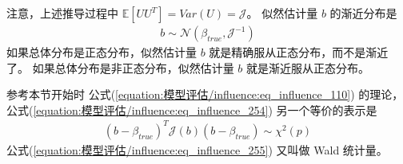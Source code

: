 \documentclass[letterpaper,10pt,english]{sphinxmanual}
\begin{document}
注意，上述推导过程中 \(\mathbb{E} \left[ U U^T  \right ]=Var(U)=\mathcal{J}\)。
似然估计量 \(b\) 的渐近分布是
\begin{equation}\label{equation:模型评估/influence:eq_influence_254}
\begin{split}b \sim \mathcal{N}(\beta_{true},\mathcal{J}^{-1})\end{split}
\end{equation}
如果总体分布是正态分布，似然估计量 \(b\) 就是精确服从正态分布，而不是渐近了。
如果总体分布是非正态分布，似然估计量 \(b\) 就是渐近服从正态分布。

参考本节开始时 公式(\ref{equation:模型评估/influence:eq_influence_110}) 的理论， 公式(\ref{equation:模型评估/influence:eq_influence_254}) 另一个等价的表示是
\begin{equation}\label{equation:模型评估/influence:eq_influence_255}
\begin{split}(b-\beta_{true})^T\mathcal{J}(b)(b-\beta_{true}) \sim \chi^2(p)\end{split}
\end{equation}
公式(\ref{equation:模型评估/influence:eq_influence_255}) 又叫做 Wald 统计量。
\end{document}
